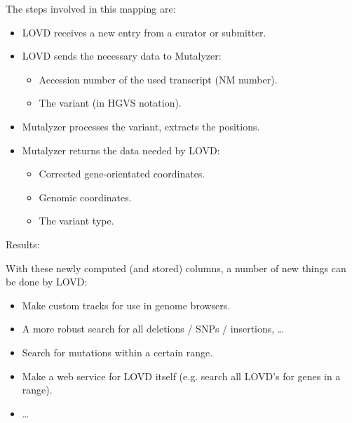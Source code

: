 \documentclass[a4, portrait]{seminar}
\begin{document}
\begin{slide}
The steps involved in this mapping are:

\vspace*{1cm}
\begin{itemize}
\item LOVD receives a new entry from a curator or submitter.
\item LOVD sends the necessary data to Mutalyzer: 
      \begin{itemize}
      \item Accession number of the used transcript (NM number).
      \item The variant (in HGVS notation).
      \end{itemize}
\item Mutalyzer processes the variant, extracts the positions.
\item Mutalyzer returns the data needed by LOVD:
      \begin{itemize}
      \item Corrected gene-orientated coordinates.
      \item Genomic coordinates.
      \item The variant type.
      \end{itemize}
\end{itemize}
\vfill
\end{slide}

\begin{slide}
Results:

\vspace*{1cm}
With these newly computed (and stored) columns, a number of new things can
be done by LOVD:

\begin{itemize}
\item Make custom tracks for use in genome browsers.
\item A more robust search for all deletions / SNPs / insertions, \ldots
\item Search for mutations within a certain range.
\item Make a web service for LOVD itself (e.g. search all LOVD's for genes
      in a range).
\item \ldots
\end{itemize}
\vfill
\end{slide}
\end{document}
